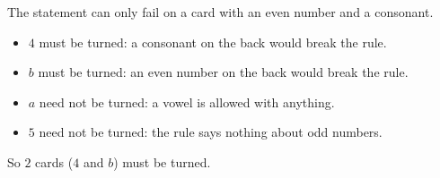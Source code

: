 The statement can only fail on a card with an even number and a consonant.
\begin{itemize}
\item $4$ must be turned: a consonant on the back would break the rule.
\item $b$ must be turned: an even number on the back would break the rule.
\item $a$ need not be turned: a vowel is allowed with anything.
\item $5$ need not be turned: the rule says nothing about odd numbers.
\end{itemize}
So $\boxed{2}$ cards ($4$ and $b$) must be turned.
